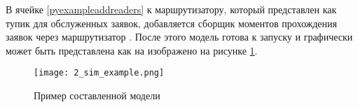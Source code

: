 В ячейке \ref{pyexampleaddreaders} к маршрутизатору, который представлен как тупик для обслуженных заявок, добавляется сборщик моментов прохождения заявок через маршрутизатор . После этого модель готова к запуску и графически может быть представлена как на изображено на рисунке \ref{py_example_model}.

\begin{figure}[H]
	\centering
	\texttt{[image: 2\_sim\_example.png]}
	\caption{Пример составленной модели}
	\label{py_example_model}
\end{figure}
 
\clearpage